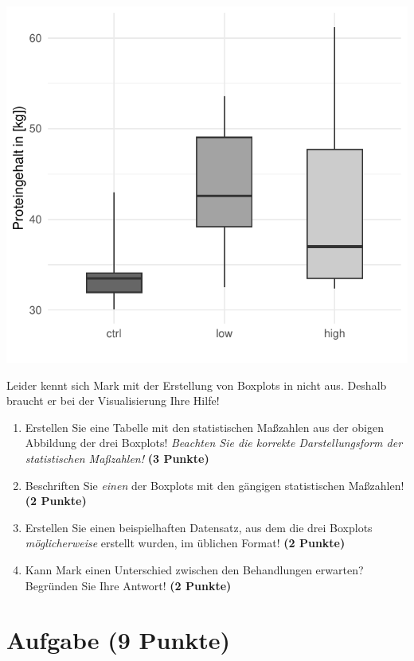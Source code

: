 \documentclass[a4paper, 9pt]{scrartcl}\usepackage[]{graphicx}\usepackage[]{xcolor}
\makeatletter
\def\maxwidth{ %
  \ifdim\Gin@nat@width>\linewidth
    \linewidth
  \else
    \Gin@nat@width
  \fi
}
\makeatother
\begin{document}
{\centering \includegraphics[width=\maxwidth]{img/boxplot-02-zer-1} 

}




Leider kennt sich Mark mit der Erstellung von Boxplots in \Rlogo nicht aus. Deshalb braucht er bei der Visualisierung Ihre Hilfe!

\begin{enumerate}
\item Erstellen Sie eine Tabelle mit den statistischen Maßzahlen aus der obigen Abbildung der drei Boxplots! \textit{Beachten Sie die korrekte Darstellungsform der statistischen Maßzahlen!} \textbf{(3 Punkte)}
\item Beschriften Sie \textit{einen} der Boxplots mit den gängigen statistischen Maßzahlen! \textbf{(2 Punkte)}
\item Erstellen Sie einen beispielhaften Datensatz, aus dem die drei Boxplots \textit{möglicherweise} erstellt wurden, im \Rlogo üblichen Format! \textbf{(2 Punkte)}
\item Kann Mark einen Unterschied zwischen den Behandlungen erwarten? Begründen Sie Ihre Antwort! \textbf{(2 Punkte)}
\end{enumerate} 
\clearpage

\section{Aufgabe \hfill (9 Punkte)}
\end{document}
